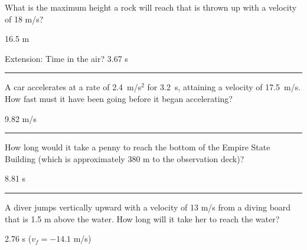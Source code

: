 \documentclass[12pt]{exam}
\begin{document}
\Large

\def\mystrut{\protect\rule[-2.2ex]{0ex}{2.2ex}} 
\qformat{ \textbf{Task \#\thequestion}
  \ifthenelse{\equal{\thequestion}{\thequestiontitle}}
    {}
    {: \emph{\thequestiontitle}}
  \mystrut  \hfill}


\begin{questions}


\question
  What is the maximum height a rock will reach that is thrown up with a velocity of 18 m/s? 

  \begin{solution}
    16.5 m

    Extension: Time in the air?  3.67 s
  \end{solution}


\vs \hrule \vs

\question
  A car accelerates at a rate of 2.4~m/s$^2$ for 3.2~s, attaining a velocity of 17.5~m/s.  How fast must it have been going before it began accelerating?

  \begin{solution}
      9.82 m/s
  \end{solution}

\vs \hrule \vs


\question
  How long would it take a penny to reach the bottom of the Empire State Building (which is approximately 380 m to the observation deck)?

  \begin{solution}
    8.81 s
  \end{solution}

\vs \hrule \vs

\question
  A diver jumps vertically upward with a velocity of 13 m/s from a diving board that is 1.5 m above the water.  How long will it take her to reach the water? 

  \begin{solution}
    2.76 s ($v_f=-14.1$ m/s)
  \end{solution}

  \vs


\end{questions}
\end{document}
